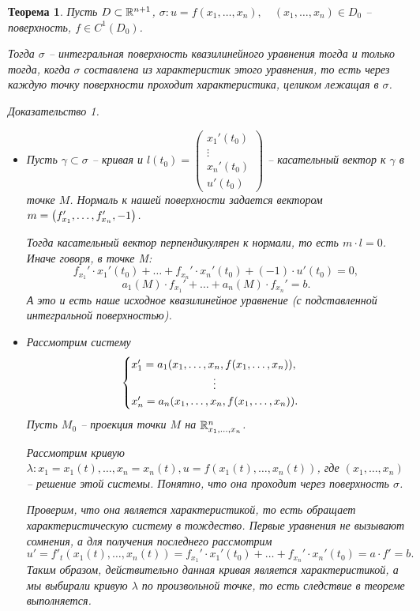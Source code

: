 \documentclass[a5paper, 10pt]{article}
\theoremstyle{definition}
\theoremstyle{plain}
\newtheorem{Th}{Теорема}
\theoremstyle{remark}
\newtheorem*{Proof}{Доказательство}
\begin{document}
    \begin{Th}
    Пусть $D \subset \mathbb{R}^{n+1}$, $\sigma: u=f(x_1, \dots, x_n), \quad (x_1, \dots, x_n) \in D_0$ -- поверхность, $f\in C^1(D_0)$.

    Тогда $\sigma$ -- интегральная поверхность квазилинейного уравнения тогда и только тогда, когда $\sigma$ составлена из характеристик этого уравнения, то есть через каждую точку поверхности проходит характеристика, целиком лежащая в $\sigma$.
    \begin{Proof}
       \begin{itemize}
           \item[$\Leftarrow$] Пусть $\gamma \subset \sigma$ -- кривая и $l(t_0) = \begin{pmatrix} x_1'(t_0)\\ \vdots\\ x_n'(t_0) \\ u'(t_0) \end{pmatrix}$ -- касательный вектор к $\gamma$ в точке $M$.
               Нормаль к нашей поверхности задается вектором $m=\left(f_{x_1}', \dots, f_{x_n}', -1\right)$.

               Тогда касательный вектор перпендикулярен к нормали, то есть $m\cdot l = 0$. Иначе говоря, в точке M:
               \[
                   f_{x_1}' \cdot x_1'(t_0) + \dots + f_{x_n}' \cdot x_n'(t_0) + (-1) \cdot u'(t_0) = 0,
               \] 
               \[
                   a_1(M) \cdot f_{x_1}' + \dots + a_n(M) \cdot f_{x_n}' = b.
               \] 
               А это и есть наше исходное квазилинейное уравнение (с подставленной интегральной поверхностью).
          \item[$\Rightarrow$] Рассмотрим систему
              \[
              \begin{cases}
                  x_1' = a_1(x_1, \dots, x_n, f(x_1,\dots, x_n)),\\
                  \hfill \vdots \hfill\\
                  x_n' = a_n(x_1, \dots, x_n, f(x_1, \dots, x_n)).
              \end{cases}
              \] 
              Пусть $M_0$ -- проекция точки $M$ на $\mathbb{R}^n_{x_1, \dots, x_n}$.

              Рассмотрим кривую $\lambda: x_1=x_1(t), \dots, x_n=x_n(t), u=f(x_1(t), \dots, x_n(t))$, где $(x_1, \dots, x_n)$ -- решение этой системы. Понятно, что она проходит через  поверхность $\sigma$.

              Проверим, что она является характеристикой, то есть обращает характеристическую систему в тождество. 
              Первые уравнения не вызывают сомнения, а для получения последнего рассмотрим 
              \[
              u' = f'_t(x_1(t), \dots, x_n(t)) =    f_{x_1}' \cdot x_1'(t_0) + \dots + f_{x_n}' \cdot x_n'(t_0) = a\cdot f' = b. 
              \] 
              Таким образом, действительно данная кривая является характеристикой, а мы выбирали кривую $\lambda$ по произвольной точке, то есть следствие в теореме выполняется.
      \end{itemize}
    \end{Proof}
    \end{Th}
\end{document}
